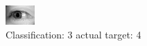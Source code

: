 \begin{figure}[h!]
\begin{center}
\includegraphics[width=0.60\columnwidth]{figures/ID3153_class_3_target_4.png}
\end{center}
\caption{ Classification: 3 actual target: 4}
\label{fig:ID3153_class_3_target_4}
\end{figure}
